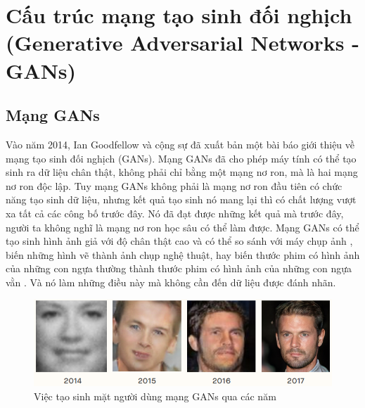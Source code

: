 
\section{\texorpdfstring{Cấu trúc mạng tạo sinh đối nghịch (Generative Adversarial Networks - GANs}{gans})}

\subsection{Mạng GANs}\label{sec:base_knowledge_gans}
Vào năm 2014, Ian Goodfellow và cộng sự đã xuất bản một bài báo \cite{gans_base} giới thiệu về mạng tạo sinh đối nghịch (GANs). Mạng GANs đã cho phép máy tính có thể tạo sinh ra dữ liệu chân thật, không phải chỉ bằng một mạng nơ ron, mà là hai mạng nơ ron độc lập. Tuy mạng GANs không phải là mạng nơ ron đầu tiên có chức năng tạo sinh dữ liệu, nhưng kết quả tạo sinh nó mang lại thì có chất lượng vượt xa tất cả các công bố trước đây. Nó đã đạt được những kết quả mà trước đây, người ta không nghĩ là mạng nơ ron học sâu có thể làm được. Mạng GANs có thể tạo sinh hình ảnh giả với độ chân thật cao và có thể so sánh với máy chụp ảnh \cite{gp_gan}, biến những hình vẽ thành ảnh chụp nghệ thuật, hay biến thước phim có hình ảnh của những con ngựa thường thành thước phim có hình ảnh của những con ngựa vằn \cite{cycle_gan}. Và nó làm những điều này mà không cần đến dữ liệu được đánh nhãn.

\begin{figure}[H]
    \centering
    \includegraphics[width=15cm]{./content/materials/gans-faces.png}
    \caption{Việc tạo sinh mặt người dùng mạng GANs qua các năm \cite{gans_faces}}
\end{figure}

